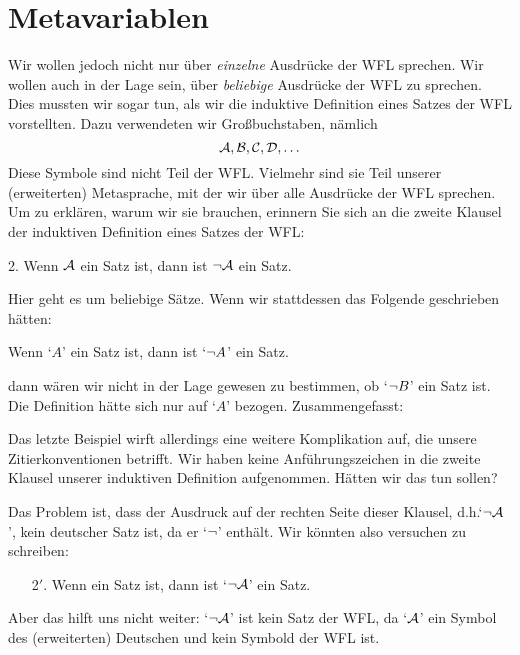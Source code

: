 \section{Metavariablen}\label{s:Metavariables}
Wir wollen jedoch nicht nur über \emph{einzelne} Ausdrücke der WFL sprechen. Wir wollen auch in der Lage sein, über \emph{beliebige} Ausdrücke der WFL zu sprechen. Dies mussten wir sogar tun, als wir die induktive Definition eines Satzes der WFL vorstellten. Dazu verwendeten wir Gro{\ss}buchstaben, nämlich
	$$\mathcal{A}, \mathcal{B}, \mathcal{C}, \mathcal{D}, \ldots$$
Diese Symbole sind nicht Teil der WFL. Vielmehr sind sie Teil unserer (erweiterten) Metasprache, mit der wir über alle Ausdrücke der WFL sprechen. Um zu erklären, warum wir sie brauchen, erinnern Sie sich an die zweite Klausel der induktiven Definition eines Satzes der WFL:
	\begin{earg}
		\item[2.] Wenn $\mathcal{A}$ ein Satz ist, dann ist $\neg \mathcal{A}$ ein Satz.
	\end{earg}
Hier geht es um beliebige Sätze. Wenn wir stattdessen das Folgende geschrieben hätten:
	\begin{ebullet}
		\item Wenn `$A$' ein Satz ist, dann ist `$\neg A$' ein Satz.
	\end{ebullet}
dann wären wir nicht in der Lage gewesen zu bestimmen, ob `$\neg B$' ein Satz ist. Die Definition hätte sich nur auf `$A$' bezogen. Zusammengefasst:

Das letzte Beispiel wirft allerdings eine weitere Komplikation auf, die unsere Zitierkonventionen betrifft. Wir haben keine Anführungszeichen in die zweite Klausel unserer induktiven Definition aufgenommen. Hätten wir das tun sollen?

Das Problem ist, dass der Ausdruck auf der rechten Seite dieser Klausel, d.h.\@ `$\neg\mathcal{A}$', kein deutscher Satz ist, da er `$\neg$' enthält. Wir könnten also versuchen zu schreiben:
	\begin{enumerate}
		\item[2$'$.] Wenn  ein Satz ist, dann ist `$\neg \mathcal{A}$' ein Satz.
	\end{enumerate}
Aber das hilft uns nicht weiter: `$\neg \mathcal{A}$' ist kein Satz der WFL, da `$\mathcal{A}$' ein Symbol des (erweiterten) Deutschen und kein Symbold der WFL ist.

